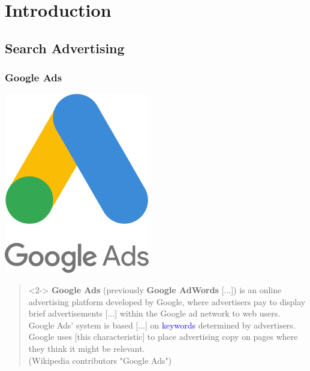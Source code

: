 \section{Introduction}

\subsection{Search Advertising}

\begin{frame}
	\frametitle{Google Ads}
	\begin{center}
		\includegraphics[scale=0.2]{./resources/images/240px-Google_Ads_logo}
    \end{center}
    \begin{quote}<2->
        \textbf{Google Ads} (previously \textbf{Google AdWords} [...]) is an online advertising platform developed by Google, where advertisers pay to display brief advertisements [...] within the Google ad network to web users. Google Ads' system is based [...] on \textcolor{blue}{keywords} determined by advertisers. Google uses [this characteristic] to place advertising copy on pages where they think it might be relevant.\\
        \flushright \textnormal{(Wikipedia contributors "Google Ads")}
    \end{quote}
\end{frame}

